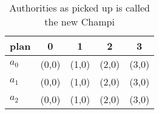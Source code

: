 \documentclass[a4paper]{article}
\begin{document}
\begin{table}
\begin{adjustbox}{width=0.6\columnwidth}
\begin{tabular}{|l|l|l|l|l|}
\hline
\textbf{plan} & \multicolumn{1}{c|}{\textbf{0}} & \multicolumn{1}{c|}{\textbf{1}} & \multicolumn{1}{c|}{\textbf{2}} & \multicolumn{1}{c|}{\textbf{3}} \\ \hline
\textbf{$a_0$}  & (0,0) & (1,0) & (2,0) & (3,0) \\ \hline
\textbf{$a_1$}  & (0,0) & (1,0) & (2,0) & (3,0) \\ \hline
\textbf{$a_2$}  & (0,0) & (1,0) & (2,0) & (3,0) \\ \hline
\end{tabular}
\end{adjustbox}
\caption{Authorities as picked up is called the new Champi
}
\end{table}
\end{document}
